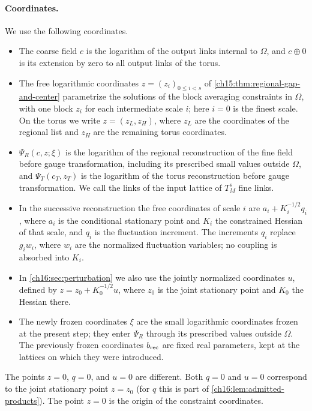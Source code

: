 \paragraph{Coordinates.}
We use the following coordinates.
\begin{itemize}
\item The coarse field $c$ is the logarithm of the output links internal to $\Omega$, and $c\oplus0$ is its extension by zero to all output links of the torus.
\item The free logarithmic coordinates $z=(z_i)_{0\le i<s}$ of \cref{ch15:thm:regional-gap-and-center} parametrize the solutions of the block averaging constraints in $\Omega$, with one block $z_i$ for each intermediate scale $i$; here $i=0$ is the finest scale. On the torus we write $z=(z_L,z_H)$, where $z_L$ are the coordinates of the regional list and $z_H$ are the remaining torus coordinates.
\item $\Psi_R(c,z;\xi)$ is the logarithm of the regional reconstruction of the fine field before gauge transformation, including its prescribed small values outside $\Omega$, and $\Psi_T(c_T,z_T)$ is the logarithm of the torus reconstruction before gauge transformation. We call the links of the input lattice of $T_M^s$ fine links.
\item In the successive reconstruction the free coordinates of scale $i$ are $a_i+K_i^{-1/2}q_i$, where $a_i$ is the conditional stationary point and $K_i$ the constrained Hessian of that scale, and $q_i$ is the fluctuation increment. The increments $q_i$ replace $g_iw_i$, where $w_i$ are the normalized fluctuation variables; no coupling is absorbed into $K_i$.
\item In \cref{ch16:sec:perturbation} we also use the jointly normalized coordinates $u$, defined by $z=z_0+K_0^{-1/2}u$, where $z_0$ is the joint stationary point and $K_0$ the Hessian there.
\item The newly frozen coordinates $\xi$ are the small logarithmic coordinates frozen at the present step; they enter $\Psi_R$ through its prescribed values outside $\Omega$. The previously frozen coordinates $b_{\mathrm{rec}}$ are fixed real parameters, kept at the lattices on which they were introduced.
\end{itemize}
The points $z=0$, $q=0$, and $u=0$ are different. Both $q=0$ and $u=0$ correspond to the joint stationary point $z=z_0$ (for $q$ this is part of \cref{ch16:lem:admitted-products}). The point $z=0$ is the origin of the constraint coordinates.

